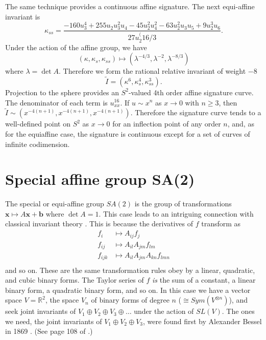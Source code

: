 \documentclass{article}
\def\R{\mathbb{R}}
\begin{document}
The same technique provides a continuous affine signature. The next equi-affine invariant is
$$ \kappa_{ss} = \frac{-160 u_{3}^4 + 255 u_2 u_3^2 u_4 - 45 u_2^2 u_4^2 - 63 u_2^2 u_3 u_5 + 9 u_2^3 u_6}{27 u_2^({16/3}}.$$
Under the action of the affine group, we
have
$$(\kappa,\kappa_s,\kappa_{ss})\mapsto (\lambda^{-4/3},\lambda^{-2},\lambda^{-8/3})$$
where $\lambda = \det A$. Therefore we form the rational relative invariant of weight $-8$
$$\tilde I = (\kappa^6,\kappa_s^4,\kappa_{ss}^3).$$
Projection to the sphere provides an $S^2$-valued 4th order affine signature curve.
The denominator of each term is $u_{xx}^{16}$. If $u\sim x^n$ as $x\to 0$ with 
$n\ge 3$, then $\tilde I \sim (x^{-4(n+1)},x^{-4(n+1)},x^{-4(n+1)})$.
Therefore the signature curve tends to a well-defined point on $S^2$ as $x\to 0$ 
for an inflection point of any order $n$, and, as for the equiaffine case, the signature is continuous except for
a set of curves of infinite codimension.

\section{Special affine group {\bf SA(2)}}

The special or equi-affine group $SA(2)$ is the group of transformations $\mathbf{x}\mapsto A\mathbf{x}+\mathbf{b}$
where $\det A =1$.  This case leads to an intriguing connection with classical invariant theory \cite{olverclassical}.
This is because the derivatives of $f$ transform as
\begin{equation}
\begin{aligned}
f_i & \mapsto A_{ij} f_j \\
f_{ij} & \mapsto A_{il} A_{jm} f_{lm}\\
f_{ijk} & \mapsto A_{il}A_{jm}A_{kn}f_{lmn}\\
\end{aligned}
\end{equation}
and so on. These are the same transformation rules obey by a linear, quadratic, and cubic binary forms.
The Taylor series of $f$ {\em is} the sum of a constant, a linear binary form, a quadratic binary form, and so on.
 In this case we have a vector
space $V=\R^2$, the space $V_n$ of binary forms of degree $n$ ($\cong Sym(V^{\otimes n})$), and seek
joint invariants of $V_1\oplus V_2\oplus V_3\oplus\dots$ under the action of $SL(V)$. The ones we need,
the joint invariants of $V_1\oplus V_2\oplus V_3$, 
were found first by Alexander Bessel in 1869 \cite{bessel}. (See page 108 of \cite{draisma}.)
\end{document}
